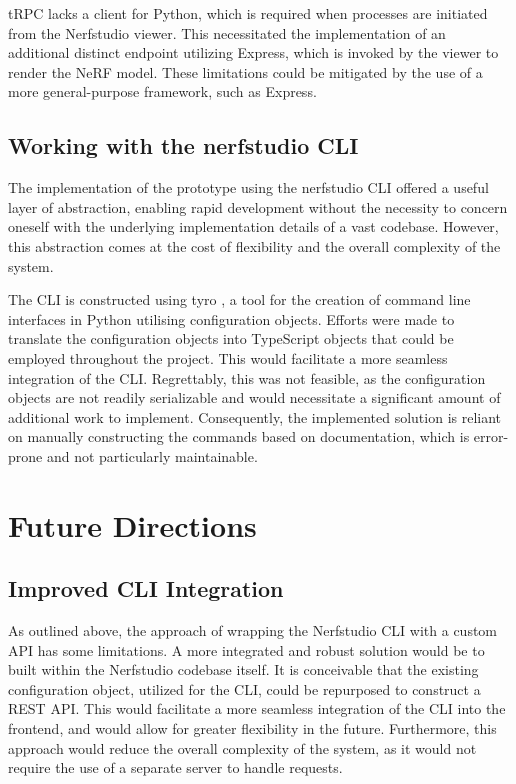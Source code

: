 tRPC lacks a client for Python, which is required when processes are initiated from the Nerfstudio viewer.
This necessitated the implementation of an additional distinct endpoint utilizing Express, which is invoked by the viewer to render the NeRF model.
These limitations could be mitigated by the use of a more general-purpose framework, such as Express.

\subsection*{Working with the nerfstudio CLI}

The implementation of the prototype using the nerfstudio CLI offered a useful layer of abstraction, enabling rapid development without the necessity to concern oneself with the underlying implementation details of a vast codebase.
However, this abstraction comes at the cost of flexibility and the overall complexity of the system.

The CLI is constructed using tyro \cite{yi_tyro_nodate}, a tool for the creation of command line interfaces in Python utilising configuration objects.
Efforts were made to translate the configuration objects into TypeScript objects that could be employed throughout the project.
This would facilitate a more seamless integration of the CLI.
Regrettably, this was not feasible, as the configuration objects are not readily serializable and would necessitate a significant amount of additional work to implement.
Consequently, the implemented solution is reliant on manually constructing the commands based on documentation, which is error-prone and not particularly maintainable.
\section{Future Directions}
\label{sec:system:future}

\subsection*{Improved CLI Integration}

As outlined above, the approach of wrapping the Nerfstudio CLI with a custom API has some limitations.
A more integrated and robust solution would be to built within the Nerfstudio codebase itself.
It is conceivable that the existing configuration object, utilized for the CLI, could be repurposed to construct a REST API.
This would facilitate a more seamless integration of the CLI into the frontend, and would allow for greater flexibility in the future.
Furthermore, this approach would reduce the overall complexity of the system, as it would not require the use of a separate server to handle requests.

